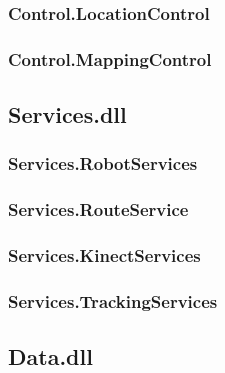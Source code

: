 \subsubsection{Control.LocationControl}

\subsubsection{Control.MappingControl}


\subsection{Services.dll}\label{arkitektur:services}


\subsubsection{Services.RobotServices}

\subsubsection{Services.RouteService}

\subsubsection{Services.KinectServices}

\subsubsection{Services.TrackingServices}


\subsection{Data.dll}\label{arkitektur:data}







